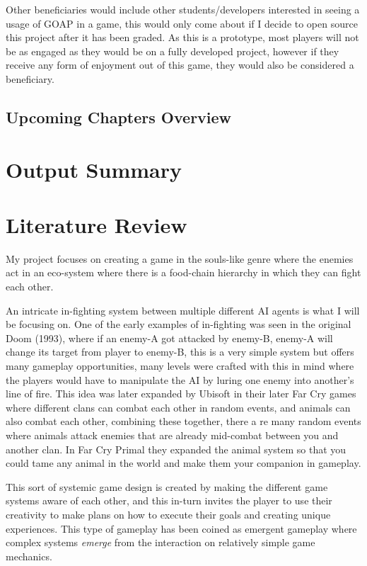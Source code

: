 \documentclass[11pt]{report}
\begin{document}
Other beneficiaries would include other students/developers interested in seeing a usage of GOAP in a game, this would only come about if I decide to open source this project after it has been graded. As this is a prototype, most players will not be as engaged as they would be on a fully developed project, however if they receive any form of enjoyment out of this game, they would also be considered a beneficiary.



\section{Upcoming Chapters Overview}

\chapter{Output Summary}

\chapter{Literature Review}
My project focuses on creating a game in the souls-like genre where the enemies act in an eco-system where there is a food-chain hierarchy in which they can fight each other.

An intricate in-fighting system between multiple different AI agents is what I will be focusing on. One of the early examples of in-fighting was seen in the original Doom (1993)\cite{doom93}, where if an enemy-A got attacked by enemy-B, enemy-A will change its target from player to enemy-B, this is a very simple system but offers many gameplay opportunities, many levels were crafted with this in mind where the players would have to manipulate the AI by luring one enemy into another's line of fire.
This idea was later expanded by Ubisoft in their later Far Cry games where different clans can combat each other in random events, and animals can also combat each other, combining these together, there a re many random events where animals attack enemies that are already mid-combat between you and another clan. In Far Cry Primal they expanded the animal system so that you could tame any animal in the world and make them your companion in gameplay.

This sort of systemic game design is created by making the different game systems aware of each other, and this in-turn invites the player to use their creativity to make plans on how to execute their goals and creating unique experiences. This type of gameplay has been coined as emergent gameplay where complex systems \textit{emerge} from the interaction on relatively simple game mechanics.\cite{emergentGameplay}
\end{document}
